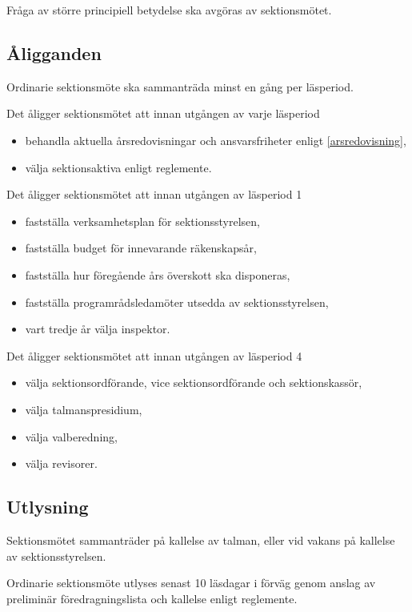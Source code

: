 \documentclass{styrdokument}
\begin{document}
\? Fråga av större principiell betydelse ska avgöras av sektionsmötet.

\subsection{Åligganden}

\? Ordinarie sektionsmöte ska sammanträda minst en gång per läsperiod.

\? Det åligger sektionsmötet att innan utgången av varje läsperiod
\begin{itemize}
	\item behandla aktuella årsredovisningar och ansvarsfriheter enligt \cref{arsredovisning},
    \item välja sektionsaktiva enligt reglemente.
\end{itemize}

\? Det åligger sektionsmötet att innan utgången av läsperiod 1
\begin{itemize}
    \item fastställa verksamhetsplan för sektionsstyrelsen,
    \item fastställa budget för innevarande räkenskapsår,
    \item fastställa hur föregående års överskott ska disponeras,
    \item fastställa programrådsledamöter utsedda av sektionsstyrelsen,
    \item vart tredje år välja inspektor.
\end{itemize}

\? Det åligger sektionsmötet att innan utgången av läsperiod 4
\begin{itemize}
    \item välja sektionsordförande, vice sektionsordförande och sektionskassör,
    \item välja talmanspresidium,
    \item välja valberedning,
    \item välja revisorer.
\end{itemize}

\subsection{Utlysning} \label{utlysning}

\? Sektionsmötet sammanträder på kallelse av talman, eller vid vakans på kallelse av sektionsstyrelsen.

\? Ordinarie sektionsmöte utlyses senast 10 läsdagar i förväg genom anslag av preliminär föredragningslista och kallelse enligt reglemente.
\end{document}
